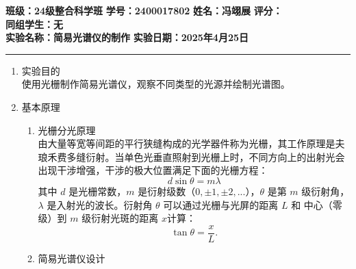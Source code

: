 \documentclass[a4paper]{article}
\begin{document}
\noindent\textbf{班级：24级整合科学班} \hspace{1cm} \textbf{学号：2400017802} \hspace{1cm} \textbf{姓名：冯翊展} \hspace{1cm} \textbf{评分：}\\
\textbf{同组学生：无} \\
\textbf{实验名称：简易光谱仪的制作}   \hfill \textbf{实验日期：2025年4月25日} 

\hrule
\vspace{3mm}

\begin{enumerate}[label=\chinese*.,left=0pt]
    \item 实验目的
    \\[3mm]
    使用光栅制作简易光谱仪，观察不同类型的光源并绘制光谱图。

    \item 基本原理
    \begin{enumerate}[label=\arabic*.,left=0pt]
        \item 光栅分光原理
        \\
        由大量等宽等间距的平行狭缝构成的光学器件称为光栅，其工作原理是夫琅禾费多缝衍射。当单色光垂直照射到光栅上时，不同方向上的出射光会出现干涉增强，干涉的极大位置满足下面的光栅方程：
        $$d \sin \theta = m \lambda$$
        其中 $d$ 是光栅常数，$m$ 是衍射级数（$0,\pm1,\pm2,...$），$\theta$ 是第 $m$ 级衍射角，$\lambda$ 是入射光的波长。衍射角 $\theta$ 可以通过光栅与光屏的距离 $L$ 和 中心（零级）到 $m$ 级衍射光斑的距离 $x$计算：
        $$\tan \theta = \frac{x}{L}.$$

        \item 简易光谱仪设计
        \begin{center}
\end{center}
\end{enumerate}
\end{enumerate}
\end{document}
